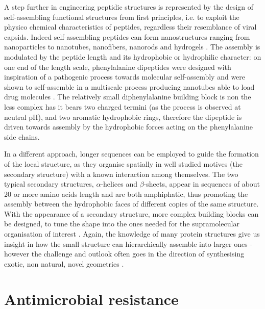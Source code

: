 A step further in engineering peptidic structures is represented by the design of self-assembling functional structures from first principles, i.e. to exploit the physico chemical characteristics of peptides, regardless their resemblance of viral capsids.
%
Indeed self-assembling peptides can form nanostructures ranging from nanoparticles to nanotubes, nanofibers, nanorods and hydrogels \cite{Fan2017,Habibi2016}. The assembly is modulated by the peptide length and its hydrophobic or hydrophilic character: on one end of the length scale, phenylalanine dipeptides were designed with inspiration of a pathogenic process towards molecular self-assembly \cite{Yan2010} and were shown to self-assemble in a multiscale process producing nanotubes able to load drug molecules \cite{Silva2013}. The relatively small diphenylalanine building block is non the less complex has it bears two charged termini (as the process is observed at neutral pH), and two aromatic hydrophobic rings, therefore the dipeptide is driven towards assembly by the hydrophobic forces acting on the phenylalanine side chains.

In a different approach, longer sequences can be employed to guide the formation of the local structure, as they organise spatially in well studied motives (the secondary structure) with a known interaction among themselves.
%
The two typical secondary structures, $\alpha$-helices and $\beta$-sheets, appear in sequences of about 20 or more amino acids length and are both amphiphatic, thus promoting the assembly between the hydrophobic faces of different copies of the same structure. With the appearance of a secondary structure, more complex building blocks can be designed, to tune the shape into the ones needed for the supramolecular organisation of interest \cite{King2014}. Again, the knowledge of many protein structures\cite{PDB} give us insight in how the small structure can hierarchically assemble into larger ones - however the challenge and outlook often goes in the direction of synthesising exotic, non natural, novel geometries \cite{Yeates2019,Malay2019}.


\section{Antimicrobial resistance}


